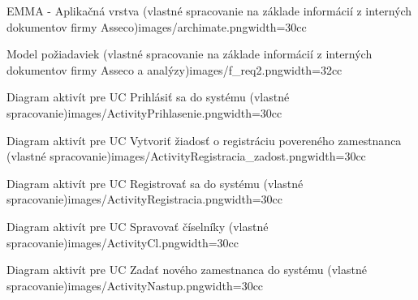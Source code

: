 
\ebib

\stopbodymatter


\setupsectionblock[backmatter][before={\setuplist[kap][before={}]}]

\startbackmatter


\stopbackmatter

%
\startappendices


\setuplabeltext[appendix=~]


{EMMA - Aplikačná vrstva (vlastné spracovanie na základe informácií z interných dokumentov firmy Asseco)}{images/archimate.png}{width=30cc}


{Model požiadaviek (vlastné spracovanie na základe informácií z interných dokumentov firmy Asseco a analýzy)}{images/f_req2.png}{width=32cc}


{Diagram aktivít pre UC Prihlásiť sa do systému (vlastné spracovanie)}{images/ActivityPrihlasenie.png}{width=30cc}

{Diagram aktivít pre UC Vytvoriť žiadosť o registráciu povereného zamestnanca (vlastné spracovanie)}{images/ActivityRegistracia_zadost.png}{width=30cc}

{Diagram aktivít pre UC Registrovať sa do systému (vlastné spracovanie)}{images/ActivityRegistracia.png}{width=30cc}

{Diagram aktivít pre UC Spravovať číselníky (vlastné spracovanie)}{images/ActivityCl.png}{width=30cc}

{Diagram aktivít pre UC Zadať nového zamestnanca do systému (vlastné spracovanie)}{images/ActivityNastup.png}{width=30cc}


